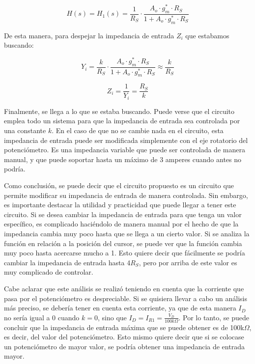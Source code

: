 \documentclass[12pt,oneside,a4paper]{article}
\begin{document}
\begin{equation}
    H(s) = H_1(s) = \frac{1}{R_S}\cdot \frac{A_o\cdot g_m^*\cdot R_S}{1 + A_o\cdot g_m^*\cdot R_S}
\end{equation}

De esta manera, para despejar la impedancia de entrada $Z_i$ que estabamos buscando:

\begin{equation}
    Y_i = \frac{k}{R_S} \cdot \frac{A_o\cdot g_m^*\cdot R_S}{1 + A_o\cdot g_m^*\cdot R_S} \approx \frac{k}{R_S}
\end{equation}

\begin{equation}
    Z_i = \frac{1}{Y_i} = \frac{R_S}{k}
\end{equation}

Finalmente, se llega a lo que se estaba buscando. Puede verse que el circuito emplea todo un sistema para 
que la impedancia de entrada sea controlada por una constante $k$. En el caso de que no se cambie nada en el 
circuito, esta impedancia de entrada puede ser modificada simplemente con el eje rotatorio del potenciómetro. 
Es una impedancia variable que puede ser controlada de manera manual, y que puede soportar hasta un máximo de 
3 amperes cuando antes no podría. 

Como conclusión, se puede decir que el circuito propuesto es un circuito que permite modificar su impedancia 
de entrada de manera controlada. Sin embargo, es importante destacar la utilidad y practicidad que puede 
llegar a tener este circuito. Si se desea cambiar la impedancia de entrada para que tenga un valor específico, 
es complicado haciéndolo de manera manual por el hecho de que la impedancia cambia muy poco hasta que se llega 
a un cierto valor. Si se analiza la función en relación a la posición del cursor, se puede ver que la función 
cambia muy poco hasta acercarse mucho a 1. Esto quiere decir que fácilmente se podría cambiar la impedancia 
de entrada hasta 4$R_S$, pero por arriba de este valor es muy complicado de controlar.

Cabe aclarar que este análisis se realizó teniendo en cuenta que la corriente que pasa por el potenciómetro 
es despreciable. Si se quisiera llevar a cabo un análisis más preciso, se debería tener en cuenta esta 
corriente, ya que de esta manera $I_D$ no sería igual a 0 cuando $k = 0$, sino que $I_D = I_{R1} =\frac{V_D}{100k\Omega}$.
Por lo tanto, se puede concluir que la impedancia de entrada máxima que se puede obtener es de 100k$\Omega$, 
es decir, del valor del potenciómetro. Esto mismo quiere decir que si se colocase un potenciómetro de 
mayor valor, se podría obtener una impedancia de entrada mayor.
\end{document}
